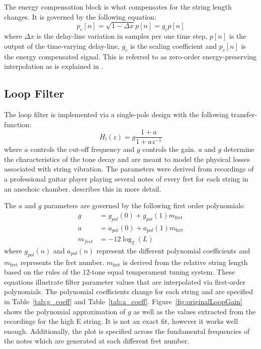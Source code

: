 \documentclass[main.tex]{subfiles}
\begin{document}
The energy compensation block is what compensates for the string length changes. It is governed by the following equation:
\begin{equation}
    p_c[n] = \sqrt{1-\Delta x}p[n] = g_c p[n]
    \label{eq:energyScaler}
\end{equation}
where $\Delta x$ is the delay-line variation in samples per one time step, $p[n]$ is the output of the time-varying delay-line, $g_c$ is the scaling coefficient and $p_c[n]$ is the energy compensated signal. This is referred to as zero-order energy-preserving interpolation as is explained in .

\subsection{Loop Filter}
\label{sec:Ch2LoopFilter}
The loop filter is implemented via a single-pole design with the following transfer-function:
\begin{equation}
    H_l(z) = g \frac{1 + a}{1 + a z^{-1}}
    \label{eqn:one-pole}
\end{equation}
where $a$ controls the cut-off frequency and $g$ controls the gain. $a$ and $g$ determine the characteristics of the tone decay and are meant to model the physical losses associated with string vibration. The parameters were derived from recordings of a professional guitar player playing several notes of every fret for each string in an anechoic chamber.  describes this in more detail.

The $a$ and $g$ parameters are governed by the following first order polynomials:
\begin{align}
    g &= g_{pol}(0) + g_{pol}(1)m_{\text{fret}}\\
    a &= a_{pol}(0) + a_{pol}(1)m_{\text{fret}}\\
    \label{eq:fretNumber}
    m_{fret} &= -12\log_2(L)
\end{align}
where $g_{pol}(n)$ and $a_{pol}(n)$ represent the different polynomial coefficients and $m_{\text{fret}}$ represents the fret number. $m_{\text{fret}}$ is derived from the relative string length based on the rules of the 12-tone equal temperament tuning system. These equations illustrate filter parameter values that are interpolated via first-order polynomials. The polynomial coefficients change for each string and are specified in Table~\ref{tab:g_coeff} and Table~\ref{tab:a_coeff}. Figure~\ref{fig:originalLoopGain} shows the polynomial approximation of $g$ as well as the values extracted from the recordings for the high E string. It is not an exact fit, however it works well enough. Additionally, the plot is specified across the fundamental frequencies of the notes which are generated at each different fret number.
\end{document}
